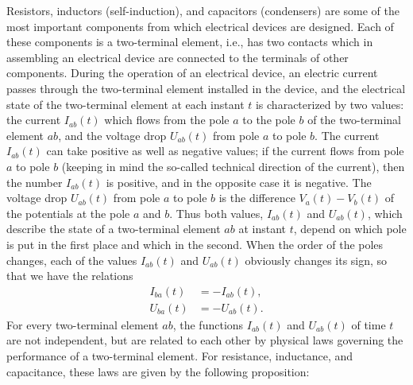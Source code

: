 \documentclass[10pt,a5paper]{book}
\theoremstyle{plain}
\theoremstyle{definition}
\theoremstyle{remark}
\begin{document}
Resistors, inductors (self-induction), and capacitors (condensers) are some of the most important components from which electrical devices are designed. Each of these components is a two-terminal element, i.e., has two contacts which in assembling an electrical device are connected to the terminals of other components. During the operation of an electrical device, an electric current passes through the two-terminal element installed in the device, and the electrical state of the two-terminal element at each instant $t$ is characterized by two values: the current $I_{a b}(t)$ which flows from the pole $a$ to the pole $b$ of the two-terminal element $a b$, and the voltage drop $U_{a b}(t)$ from pole $a$ to pole $b$. The current $I_{a b}(t)$ can take positive as well as negative values; if the current flows from pole $a$ to pole $b$ (keeping in mind the so-called technical direction of the current), then the number $I_{a b}(t)$ is positive, and in the opposite case it is negative. The voltage drop $U_{a b}(t)$ from pole $a$ to pole $b$ is the difference $V_{a}(t)-V_{b}(t)$ of the potentials at the pole $a$ and $b$. Thus both values, $I_{a b}(t)$ and $U_{a b}(t)$, which describe the state of a two-terminal element $a b$ at instant $t$, depend on which pole is put in the first place and which in the second. When the order of the poles changes, each of the values $I_{a b}(t)$ and $U_{a b}(t)$ obviously changes its sign, so that we have the relations
\begin{align*}
I_{b a}(t) & =-I_{a b}(t),  \tag{1}\\
U_{b a}(t) & =-U_{a b}(t) . \tag{2}
\end{align*}
For every two-terminal element $a b$, the functions $I_{a b}(t)$ and $U_{a b}(t)$ of time $t$ are not independent, but are related to each other by physical laws governing the performance of a two-terminal element. For resistance, inductance, and capacitance, these laws are given by the following proposition:
\end{document}
